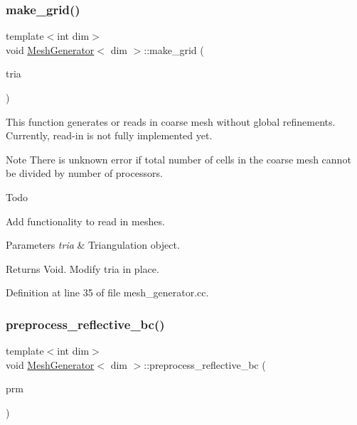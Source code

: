 \subsubsection{\texorpdfstring{make\+\_\+grid()}{make\_grid()}}
{\footnotesize\ttfamily template$<$int dim$>$ \\
void \hyperlink{class_mesh_generator}{Mesh\+Generator}$<$ dim $>$\+::make\+\_\+grid (\begin{DoxyParamCaption}\item[{parallel\+::distributed\+::\+Triangulation$<$ dim $>$ \&}]{tria }\end{DoxyParamCaption})}

This function generates or reads in coarse mesh without global refinements. Currently, read-\/in is not fully implemented yet.

\begin{DoxyNote}{Note}
There is unknown error if total number of cells in the coarse mesh cannot be divided by number of processors.
\end{DoxyNote}
\begin{DoxyRefDesc}{Todo}
\item[\hyperlink{todo__todo000006}{Todo}]Add functionality to read in meshes.\end{DoxyRefDesc}



\begin{DoxyParams}{Parameters}
{\em tria} & Triangulation object. \\
\hline
\end{DoxyParams}
\begin{DoxyReturn}{Returns}
Void. Modify tria in place. 
\end{DoxyReturn}


Definition at line 35 of file mesh\+\_\+generator.\+cc.

\mbox{\label{class_mesh_generator_a93d10aa06b5b638a859e2fc53dbea5e0}} 
\subsubsection{\texorpdfstring{preprocess\+\_\+reflective\+\_\+bc()}{preprocess\_reflective\_bc()}}
{\footnotesize\ttfamily template$<$int dim$>$ \\
void \hyperlink{class_mesh_generator}{Mesh\+Generator}$<$ dim $>$\+::preprocess\+\_\+reflective\+\_\+bc (\begin{DoxyParamCaption}\item[{Parameter\+Handler \&}]{prm }\end{DoxyParamCaption})\hspace{0.3cm}{\ttfamily [private]}}


